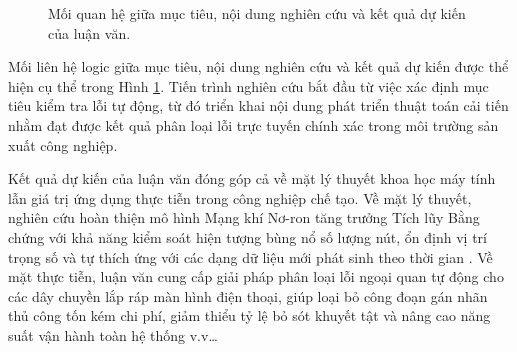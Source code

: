 \begin{figure}[htbp]
\centering
{}
\caption{Mối quan hệ giữa mục tiêu, nội dung nghiên cứu và kết quả dự kiến của luận văn.}
\label{fig:dong_co_nghien_cuu}
\end{figure}

Mối liên hệ logic giữa mục tiêu, nội dung nghiên cứu và kết quả dự kiến được thể hiện cụ thể trong Hình \ref{fig:dong_co_nghien_cuu}. Tiến trình nghiên cứu bắt đầu từ việc xác định mục tiêu kiểm tra lỗi tự động, từ đó triển khai nội dung phát triển thuật toán cải tiến nhằm đạt được kết quả phân loại lỗi trực tuyến chính xác trong môi trường sản xuất công nghiệp.

Kết quả dự kiến của luận văn đóng góp cả về mặt lý thuyết khoa học máy tính lẫn giá trị ứng dụng thực tiễn trong công nghiệp chế tạo. Về mặt lý thuyết, nghiên cứu hoàn thiện mô hình Mạng khí Nơ-ron tăng trưởng Tích lũy Bằng chứng với khả năng kiểm soát hiện tượng bùng nổ số lượng nút, ổn định vị trí trọng số và tự thích ứng với các dạng dữ liệu mới phát sinh theo thời gian \cite{fritzke1995growing}. Về mặt thực tiễn, luận văn cung cấp giải pháp phân loại lỗi ngoại quan tự động cho các dây chuyền lắp ráp màn hình điện thoại, giúp loại bỏ công đoạn gán nhãn thủ công tốn kém chi phí, giảm thiểu tỷ lệ bỏ sót khuyết tật và nâng cao năng suất vận hành toàn hệ thống v.v…